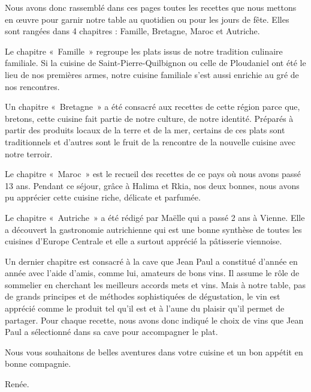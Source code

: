 Nous avons donc rassemblé dans ces pages toutes les recettes que nous mettons en œuvre pour garnir notre table au quotidien ou pour les jours de fête. Elles sont rangées dans 4 chapitres : Famille, Bretagne, Maroc et Autriche.

Le chapitre « Famille » regroupe les plats issus de notre tradition culinaire familiale. Si la cuisine de Saint-Pierre-Quilbignon ou celle de Ploudaniel ont été le lieu de nos premières armes, notre cuisine familiale s’est aussi enrichie au gré de nos rencontres.

Un chapitre « Bretagne » a été consacré aux recettes de cette région parce que, bretons, cette cuisine fait partie de notre culture, de notre identité. Préparés à partir des produits locaux de la terre et de la mer, certains de ces plats sont traditionnels et d’autres sont le fruit de la rencontre de la nouvelle cuisine avec notre terroir.

Le chapitre « Maroc » est le recueil des recettes de ce pays où nous avons passé 13 ans. Pendant ce séjour, grâce à Halima et Rkia, nos deux bonnes, nous avons pu apprécier cette cuisine riche, délicate et parfumée.

Le chapitre « Autriche » a été rédigé par Maëlle qui a passé 2 ans à Vienne. Elle a découvert la gastronomie autrichienne qui est une bonne synthèse de toutes les cuisines d’Europe Centrale et elle a surtout apprécié la pâtisserie viennoise. 

Un dernier chapitre est consacré à la cave que Jean Paul a constitué d’année en année avec l’aide d’amis, comme lui, amateurs de bons vins. Il assume le rôle de sommelier en cherchant les meilleurs accords mets et vins. Mais à notre table, pas de grands principes et de méthodes sophistiquées de dégustation, le vin est apprécié comme le produit tel qu’il est et à l’aune du plaisir qu’il permet de partager. Pour chaque recette, nous avons donc indiqué le choix de vins que Jean Paul a sélectionné dans sa cave pour accompagner le plat.

Nous vous souhaitons de belles aventures dans votre cuisine et un bon appétit en bonne compagnie.

\vspace{16pt}
\hfill
\parbox{2cm}{
Renée. 
}
